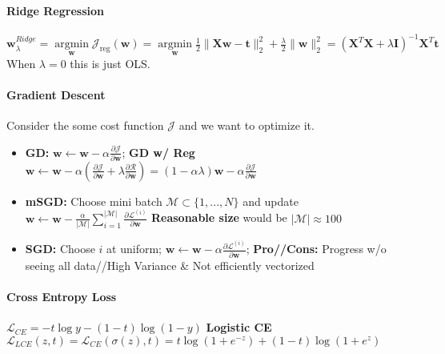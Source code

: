 \documentclass[10pt]{article}
\newcommand{\bw}{\mathbf{w}}
\begin{document}
\paragraph{Ridge Regression} $\mathbf{w}_{\lambda}^{R i d g e}=\underset{\mathbf{w}}{\operatorname{argmin}} \mathcal{J}_{\mathrm{reg}}(\mathbf{w})=\underset{\mathbf{w}}{\operatorname{argmin}} \frac{1}{2}\|\mathbf{X} \mathbf{w}-\mathbf{t}\|_{2}^{2}+\frac{\lambda}{2}\|\mathbf{w}\|_{2}^{2} =\left(\mathbf{X}^{T} \mathbf{X}+\lambda \mathbf{I}\right)^{-1} \mathbf{X}^{T} \mathbf{t} $ When $\lambda = 0$ this is just OLS.

\paragraph{Gradient Descent} Consider the some cost function $\mathcal{J}$ and we want to optimize it. 
\begin{itemize}
    \setlength\itemsep{-0.45em}

    \item \textbf{GD:} $\mathbf{w} \leftarrow \mathbf{w}-\alpha \frac{\partial \mathcal{J}}{\partial \mathbf{w}}$; \textbf{GD w/ Reg} $\mathbf{w} \leftarrow \mathbf{w}-\alpha\left(\frac{\partial \mathcal{J}}{\partial \mathbf{w}}+\lambda \frac{\partial \mathcal{R}}{\partial \mathbf{w}}\right) =(1-\alpha \lambda) \mathbf{w}-\alpha \frac{\partial \mathcal{J}}{\partial \mathbf{w}}$ 

    \item \textbf{mSGD:} Choose mini batch $\mathcal{M}\subset \{1,...,N\}$ and update $\bw \gets \bw - \frac{\alpha}{|\mathcal{M}|}\sum_{i = 1}^{\mathcal{|M|}} \frac{\partial \mathcal{L}^{(i)}}{\partial \bw}$ \textbf{Reasonable size} would be $\mathcal{|M|} \approx 100$
    
    \item \textbf{SGD:} Choose $i$ at uniform; $\bw \gets \bw - \alpha \frac{\partial \mathcal{L}^{(i)}}{\partial \bw}$; \textbf{Pro//Cons:} Progress w/o seeing all data//High Variance \& Not efficiently vectorized
\end{itemize}


\paragraph{Cross Entropy Loss} $\mathcal{L}_{CE} = -t \log y - (1-t) \log (1-y)$ \textbf{Logistic CE} $\mathcal{L}_{LCE}(z,t) = \mathcal{L}_{CE}(\sigma (z), t) = t\log (1+e^{-z}) + (1-t) \log (1+e^z)$
\end{document}
